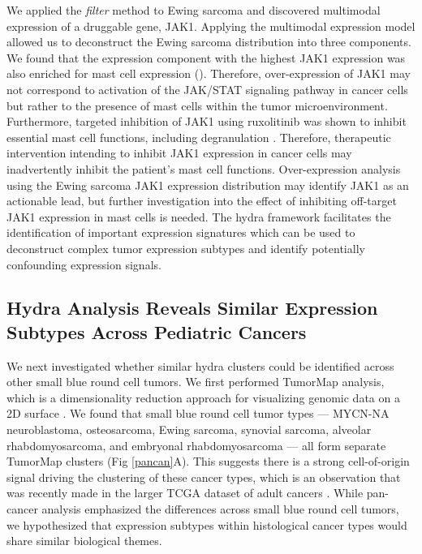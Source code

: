\documentclass[10pt,letterpaper]{article}
\begin{document}
We applied the \textit{filter} method to Ewing sarcoma and discovered multimodal expression of a druggable gene, JAK1. Applying the multimodal expression model allowed us to deconstruct the Ewing sarcoma distribution into three components. We found that the expression component with the highest JAK1 expression was also enriched for mast cell expression (). Therefore, over-expression of JAK1 may not correspond to activation of the JAK/STAT signaling pathway in cancer cells but rather to the presence of mast cells within the tumor microenvironment. Furthermore, targeted inhibition of JAK1 using ruxolitinib was shown to inhibit essential mast cell functions, including degranulation \cite{hermansJAK1JAK2Inhibitor2018}. Therefore, therapeutic intervention intending to inhibit JAK1 expression in cancer cells may inadvertently inhibit the patient’s mast cell functions. Over-expression analysis using the Ewing sarcoma JAK1 expression distribution may identify JAK1 as an actionable lead, but further investigation into the effect of inhibiting off-target JAK1 expression in mast cells is needed. The hydra framework facilitates the identification of important expression signatures which can be used to deconstruct complex tumor expression subtypes and identify potentially confounding expression signals.

\subsection*{Hydra Analysis Reveals Similar Expression Subtypes Across Pediatric Cancers}
We next investigated whether similar hydra clusters could be identified across other small blue round cell tumors. We first performed TumorMap analysis, which is a dimensionality reduction approach for visualizing genomic data on a 2D surface \cite{newtonTumorMapExploringMolecular2017}. We found that small blue round cell tumor types --- MYCN-NA neuroblastoma, osteosarcoma, Ewing sarcoma, synovial sarcoma, alveolar rhabdomyosarcoma, and embryonal rhabdomyosarcoma --- all form separate TumorMap clusters (Fig \ref{pancan}A). This suggests there is a strong cell-of-origin signal driving the clustering of these cancer types, which is an observation that was recently made in the larger TCGA dataset of adult cancers \cite{hoadleyCellofOriginPatternsDominate2018}. While pan-cancer analysis emphasized the differences across small blue round cell tumors, we hypothesized that expression subtypes within histological cancer types would share similar biological themes.
\end{document}
